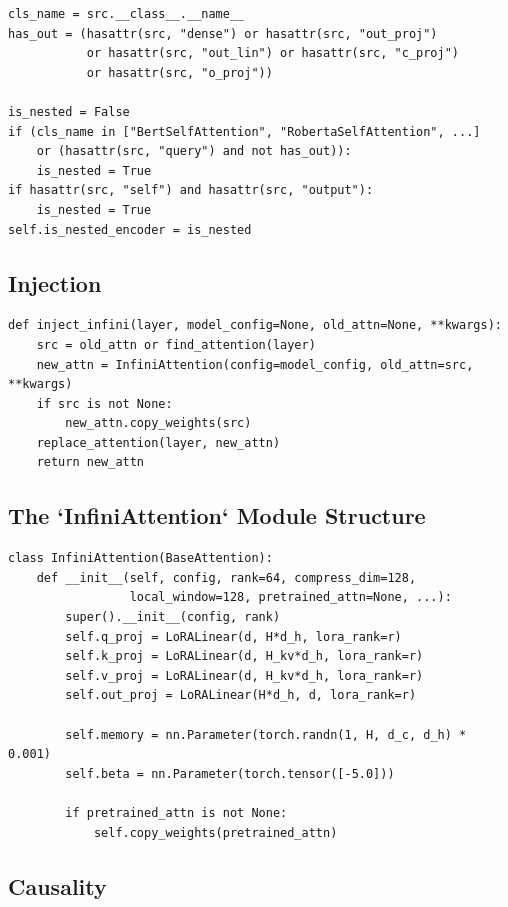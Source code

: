 \begin{lstlisting}
cls_name = src.__class__.__name__
has_out = (hasattr(src, "dense") or hasattr(src, "out_proj")
           or hasattr(src, "out_lin") or hasattr(src, "c_proj")
           or hasattr(src, "o_proj"))

is_nested = False
if (cls_name in ["BertSelfAttention", "RobertaSelfAttention", ...]
    or (hasattr(src, "query") and not has_out)):
    is_nested = True
if hasattr(src, "self") and hasattr(src, "output"):
    is_nested = True
self.is_nested_encoder = is_nested
\end{lstlisting}

\subsection{Injection}

\begin{lstlisting}
def inject_infini(layer, model_config=None, old_attn=None, **kwargs):
    src = old_attn or find_attention(layer)
    new_attn = InfiniAttention(config=model_config, old_attn=src, **kwargs)
    if src is not None:
        new_attn.copy_weights(src)
    replace_attention(layer, new_attn)
    return new_attn
\end{lstlisting}

\subsection{The `InfiniAttention` Module Structure}

\begin{lstlisting}
class InfiniAttention(BaseAttention):
    def __init__(self, config, rank=64, compress_dim=128,
                 local_window=128, pretrained_attn=None, ...):
        super().__init__(config, rank)
        self.q_proj = LoRALinear(d, H*d_h, lora_rank=r)
        self.k_proj = LoRALinear(d, H_kv*d_h, lora_rank=r)
        self.v_proj = LoRALinear(d, H_kv*d_h, lora_rank=r)
        self.out_proj = LoRALinear(H*d_h, d, lora_rank=r)
        
        self.memory = nn.Parameter(torch.randn(1, H, d_c, d_h) * 0.001)
        self.beta = nn.Parameter(torch.tensor([-5.0]))
        
        if pretrained_attn is not None:
            self.copy_weights(pretrained_attn)
\end{lstlisting}

\subsection{Causality}

